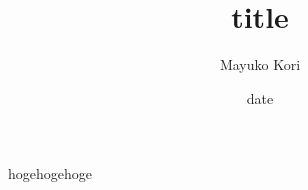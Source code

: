 \documentclass[unicode,12pt]{beamer}
\title{title}
\author{Mayuko Kori}
\date{date}
\begin{document}
\maketitle

\begin{frame}{}
hogehogehoge
\end{frame}
\end{document}
